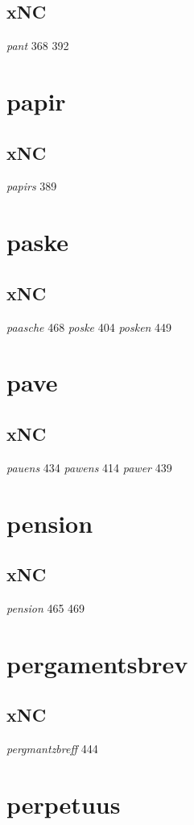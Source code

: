 \documentclass[a4paper,twocolumn]{article}
\begin{document}
\subsection{xNC}
\label{sec:org5c69411}
\emph{pant} 368 392 
\section{papir}
\label{sec:orgc74efba}
\subsection{xNC}
\label{sec:org07bc8df}
\emph{papirs} 389 
\section{paske}
\label{sec:orge5b0463}
\subsection{xNC}
\label{sec:org0d67b57}
\emph{paasche} 468 \emph{poske} 404 \emph{posken} 449 
\section{pave}
\label{sec:org6e0a572}
\subsection{xNC}
\label{sec:org94cf9c2}
\emph{pauens} 434 \emph{pawens} 414 \emph{pawer} 439 
\section{pension}
\label{sec:org627d73d}
\subsection{xNC}
\label{sec:org4b6f420}
\emph{pension} 465 469 
\section{pergamentsbrev}
\label{sec:org6a7d52a}
\subsection{xNC}
\label{sec:orgfd95d84}
\emph{pergmantzbreff} 444 
\section{perpetuus}
\label{sec:org88dbeaa}
\end{document}
